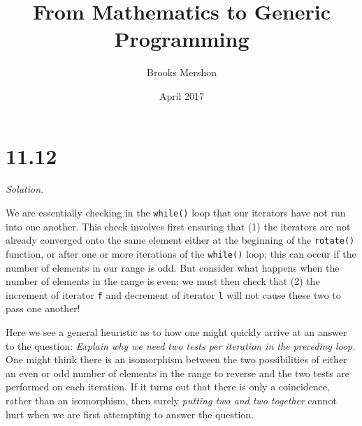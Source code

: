 \documentclass{article}
\title{From Mathematics to Generic Programming}
\author{Brooks Mershon}
\date{April 2017}
\begin{document}
\maketitle

\section*{11.12}

\textit{Solution.}

We are essentially checking in the \texttt{while()} loop that our iterators have not run into one another. This check involves first ensuring that (1) the iterators are not already converged onto the same element either at the beginning of the \texttt{rotate()} function, or after one or more iterations of the \texttt{while()} loop; this can occur if the number of elements in our range is odd. But consider what happens when the number of elements in the range is even; we must then check that (2) the increment of iterator \texttt{f} and decrement of iterator \texttt{l} will not cause these two to pass one another!

Here we see a general heuristic as to how one might quickly arrive at an answer to the question: \textit{Explain why we need two tests per iteration in the preceding  loop.} One might think there is an isomorphism between the two possibilities of either an even or odd number of elements in the range to reverse and the two tests are performed on each iteration. If it turns out that there is only a coincidence, rather than an isomorphism, then surely \textit{putting two and two together} cannot hurt when we are first attempting to answer the question.
\end{document}
